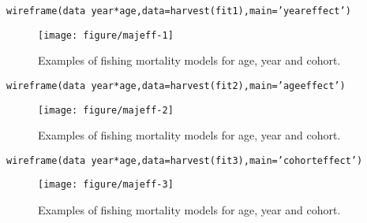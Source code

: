 \documentclass[a4paper,english,10pt]{article}\usepackage[]{graphicx}\usepackage[]{color}
\makeatletter
\def\maxwidth{ %
  \ifdim\Gin@nat@width>\linewidth
    \linewidth
  \else
    \Gin@nat@width
  \fi
}
\newcommand{\hlstr}[1]{\textcolor[rgb]{0.2,0.2,0.2}{#1}}%
\newcommand{\hlopt}[1]{\textcolor[rgb]{0.2,0.2,0.2}{#1}}%
\newcommand{\hlstd}[1]{\textcolor[rgb]{0,0,0}{#1}}%
\newcommand{\hlkwc}[1]{\textcolor[rgb]{0.361,0.506,0.596}{#1}}%
\newcommand{\hlkwd}[1]{\textcolor[rgb]{0.361,0.506,0.596}{#1}}%
\newenvironment{kframe}{%
 \def\at@end@of@kframe{}%
 \ifinner\ifhmode%
  \def\at@end@of@kframe{\end{minipage}}%
  \begin{minipage}{\columnwidth}%
 \fi\fi%
 \def\FrameCommand##1{\hskip\@totalleftmargin \hskip-\fboxsep
 \colorbox{shadecolor}{##1}\hskip-\fboxsep
     \hskip-\linewidth \hskip-\@totalleftmargin \hskip\columnwidth}%
 \MakeFramed {\advance\hsize-\width
   \@totalleftmargin\z@ \linewidth\hsize
   \@setminipage}}%
 {\par\unskip\endMakeFramed%
 \at@end@of@kframe}
\newenvironment{knitrout}{}{} %
\makeatother
\begin{document}
\begin{knitrout}
\color{fgcolor}\begin{kframe}
\begin{alltt}
\hlkwd{wireframe}\hlstd{(data}\hlopt{~}\hlstd{year}\hlopt{*}\hlstd{age,} \hlkwc{data}\hlstd{=}\hlkwd{harvest}\hlstd{(fit1),} \hlkwc{main}\hlstd{=}\hlstr{'year effect'}\hlstd{)}
\end{alltt}
\end{kframe}\begin{figure}[H]

{\centering \texttt{[image: figure/majeff-1]} 

}

\caption[Examples of fishing mortality models for age, year and cohort]{Examples of fishing mortality models for age, year and cohort.}\label{fig:majeff1}
\end{figure}

\begin{kframe}\begin{alltt}
\hlkwd{wireframe}\hlstd{(data}\hlopt{~}\hlstd{year}\hlopt{*}\hlstd{age,} \hlkwc{data}\hlstd{=}\hlkwd{harvest}\hlstd{(fit2),} \hlkwc{main}\hlstd{=}\hlstr{'age effect'}\hlstd{)}
\end{alltt}
\end{kframe}\begin{figure}[H]

{\centering \texttt{[image: figure/majeff-2]} 

}

\caption[Examples of fishing mortality models for age, year and cohort]{Examples of fishing mortality models for age, year and cohort.}\label{fig:majeff2}
\end{figure}

\begin{kframe}\begin{alltt}
\hlkwd{wireframe}\hlstd{(data}\hlopt{~}\hlstd{year}\hlopt{*}\hlstd{age,} \hlkwc{data}\hlstd{=}\hlkwd{harvest}\hlstd{(fit3),} \hlkwc{main}\hlstd{=}\hlstr{'cohort effect'}\hlstd{)}
\end{alltt}
\end{kframe}\begin{figure}[H]

{\centering \texttt{[image: figure/majeff-3]} 

}

\caption[Examples of fishing mortality models for age, year and cohort]{Examples of fishing mortality models for age, year and cohort.}\label{fig:majeff3}
\end{figure}


\end{knitrout}
\end{document}
